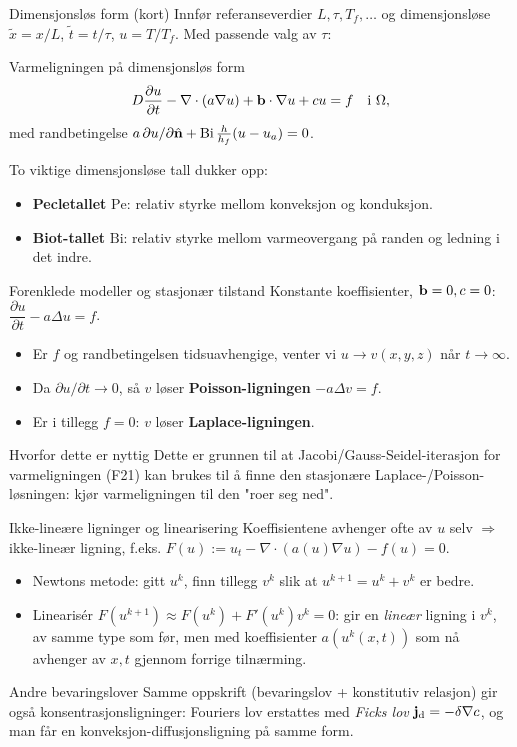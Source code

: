\documentclass[11pt,aspectratio=169]{beamer}
\begin{document}
\begin{frame}{Dimensjonsløs form (kort)}
Innfør referanseverdier $L,\tau,T_f,\ldots$ og dimensjonsløse $\tilde x=x/L$, $\tilde t=t/\tau$, $u=T/T_f$. Med passende valg av $\tau$:
\begin{oppsumb}{Varmeligningen på dimensjonsløs form}
\[
D\frac{\partial u}{\partial t} - \nabla\cdot(a\nabla u) + \mathbf{b}\cdot\nabla u + cu = f \quad \text{i }\Omega,
\]
med randbetingelse $a\,\partial u/\partial\hat{\mathbf{n}} + \mathrm{Bi}\,\frac{h}{h_f}(u-u_a)=0$.
\end{oppsumb}
To viktige dimensjonsløse tall dukker opp:
\begin{itemize}
\item \textbf{Pecletallet} $\mathrm{Pe}$: relativ styrke mellom konveksjon og konduksjon.
\item \textbf{Biot-tallet} $\mathrm{Bi}$: relativ styrke mellom varmeovergang på randen og ledning i det indre.
\end{itemize}
\end{frame}

\begin{frame}{Forenklede modeller og stasjonær tilstand}
Konstante koeffisienter, $\mathbf{b}=0,c=0$: $\dfrac{\partial u}{\partial t}-a\Delta u=f$.
\begin{itemize}
\item Er $f$ og randbetingelsen tidsuavhengige, venter vi $u\to v(x,y,z)$ når $t\to\infty$.
\item Da $\partial u/\partial t\to0$, så $v$ løser \textbf{Poisson-ligningen} $-a\Delta v=f$.
\item Er i tillegg $f=0$: $v$ løser \textbf{Laplace-ligningen}.
\end{itemize}
\begin{remb}{Hvorfor dette er nyttig}
Dette er grunnen til at Jacobi/Gauss-Seidel-iterasjon for varmeligningen (F21) kan brukes til å finne den stasjonære Laplace-/Poisson-løsningen: kjør varmeligningen til den "roer seg ned".
\end{remb}
\end{frame}

\begin{frame}{Ikke-lineære ligninger og linearisering}
Koeffisientene avhenger ofte av $u$ selv $\Rightarrow$ ikke-lineær ligning, f.eks. $F(u):=u_t-\nabla\cdot(a(u)\nabla u)-f(u)=0$.
\begin{itemize}
\item Newtons metode: gitt $u^k$, finn tillegg $v^k$ slik at $u^{k+1}=u^k+v^k$ er bedre.
\item Linearisér $F(u^{k+1})\approx F(u^k)+F'(u^k)v^k=0$: gir en \emph{lineær} ligning i $v^k$, av samme type som før, men med koeffisienter $a(u^k(x,t))$ som nå avhenger av $x,t$ gjennom forrige tilnærming.
\end{itemize}
\begin{remb}{Andre bevaringslover}
Samme oppskrift (bevaringslov + konstitutiv relasjon) gir også konsentrasjonsligninger: Fouriers lov erstattes med \emph{Ficks lov} $\mathbf{j}_{\text d}=-\delta\nabla c$, og man får en konveksjon-diffusjonsligning på samme form.
\end{remb}
\end{frame}
\end{document}
